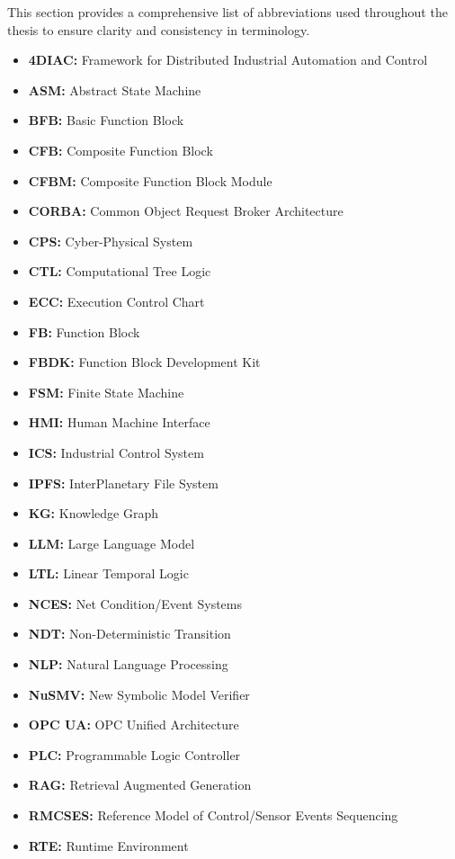 This section provides a comprehensive list of abbreviations used throughout the thesis to ensure clarity and consistency in terminology.

\begin{itemize}
\item \textbf{4DIAC:} Framework for Distributed Industrial Automation and Control
\item \textbf{ASM:} Abstract State Machine
\item \textbf{BFB:} Basic Function Block
\item \textbf{CFB:} Composite Function Block
\item \textbf{CFBM:} Composite Function Block Module
\item \textbf{CORBA:} Common Object Request Broker Architecture
\item \textbf{CPS:} Cyber-Physical System
\item \textbf{CTL:} Computational Tree Logic
\item \textbf{ECC:} Execution Control Chart
\item \textbf{FB:} Function Block
\item \textbf{FBDK:} Function Block Development Kit
\item \textbf{FSM:} Finite State Machine
\item \textbf{HMI:} Human Machine Interface
\item \textbf{ICS:} Industrial Control System
\item \textbf{IPFS:} InterPlanetary File System
\item \textbf{KG:} Knowledge Graph
\item \textbf{LLM:} Large Language Model
\item \textbf{LTL:} Linear Temporal Logic
\item \textbf{NCES:} Net Condition/Event Systems
\item \textbf{NDT:} Non-Deterministic Transition
\item \textbf{NLP:} Natural Language Processing
\item \textbf{NuSMV:} New Symbolic Model Verifier
\item \textbf{OPC UA:} OPC Unified Architecture
\item \textbf{PLC:} Programmable Logic Controller
\item \textbf{RAG:} Retrieval Augmented Generation
\item \textbf{RMCSES:} Reference Model of Control/Sensor Events Sequencing
\item \textbf{RTE:} Runtime Environment

\end{itemize}
